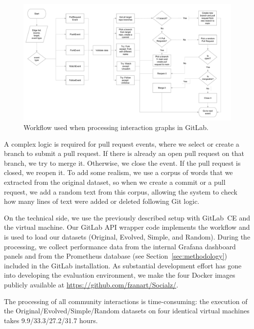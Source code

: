 \documentclass[dvipsnames,format=sigconf,anonymous=False,review=false, balance=false]{acmart}
\begin{document}
\begin{figure}
\centering\vspace{-4mm}
\includegraphics[width=\linewidth]{Flowchart.pdf}
\vspace{-13mm}
\caption{Workflow used when processing interaction graphs in GitLab.}
\label{fig:image3}
\end{figure}

A complex logic is required for pull request events, where we select or create a branch to submit a pull request. If there is already an open pull request on that branch, we try to merge it. Otherwise, we close the event. If the pull request is closed, we reopen it. To add some realism, %
we use a corpus of words that we extracted from the original dataset, so when we create a commit or a pull request, we add a random text from this corpus, allowing the system to check how many lines of text were added or deleted following Git logic.

On the technical side, we use the previously described setup with GitLab~CE and the virtual machine. 
Our GitLab API wrapper code implements the workflow and is used to load our datasets (Original, Evolved, Simple, and Random). 
During the processing, we collect performance data from the internal Grafana dashboard panels and from the Prometheus database (see Section~\ref{sec:methodology}) included in the GitLab installation. As substantial development effort has gone into developing the evaluation environment, we make the four Docker images publicly available at \url{https://github.com/fzanart/Socialz/}.

The processing of all community interactions is time-consuming: the execution of the Original/Evolved/Simple/Random datasets on four identical virtual machines takes 9.9/33.3/27.2/31.7 hours.
\end{document}
